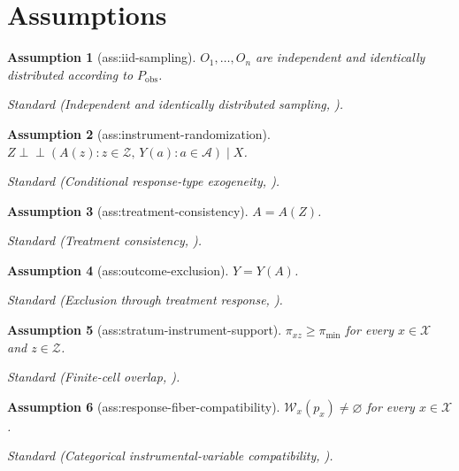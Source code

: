 \documentclass{article}
\newtheorem{assumption}{Assumption}
\begin{document}
\section{Assumptions}

\begin{assumption}[ass:iid-sampling]\label{ass:iid-sampling}
\(O_1,\ldots,O_n\) are independent and identically distributed according to \(P_{\mathrm{obs}}\).
\par\smallskip\noindent\emph{Standard} (Independent and identically distributed sampling, \cite{vanDerVaart1998}).
\end{assumption}

\begin{assumption}[ass:instrument-randomization]\label{ass:instrument-randomization}
\(Z\perp\!\!\perp (A(z):z\in\mathcal Z,\,Y(a):a\in\mathcal A)\mid X\).
\par\smallskip\noindent\emph{Standard} (Conditional response-type exogeneity, \cite{SongEtAl2026CategoricalIV}).
\end{assumption}

\begin{assumption}[ass:treatment-consistency]\label{ass:treatment-consistency}
\(A=A(Z)\).
\par\smallskip\noindent\emph{Standard} (Treatment consistency, \cite{SongEtAl2026CategoricalIV}).
\end{assumption}

\begin{assumption}[ass:outcome-exclusion]\label{ass:outcome-exclusion}
\(Y=Y(A)\).
\par\smallskip\noindent\emph{Standard} (Exclusion through treatment response, \cite{SongEtAl2026CategoricalIV}).
\end{assumption}

\begin{assumption}[ass:stratum-instrument-support]\label{ass:stratum-instrument-support}
\(\pi_{xz}\geq\pi_{\min}\) for every \(x\in\mathcal X\) and \(z\in\mathcal Z\).
\par\smallskip\noindent\emph{Standard} (Finite-cell overlap, \cite{HruzaEtAl2026CategoricalPIL}).
\end{assumption}

\begin{assumption}[ass:response-fiber-compatibility]\label{ass:response-fiber-compatibility}
\(\mathcal W_x(p_x)\neq\varnothing\) for every \(x\in\mathcal X\).
\par\smallskip\noindent\emph{Standard} (Categorical instrumental-variable compatibility, \cite{SongEtAl2026CategoricalIV}).
\end{assumption}
\end{document}
